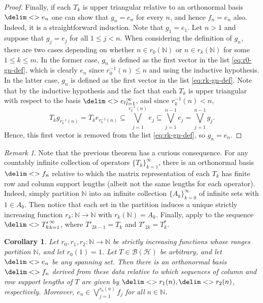 \documentclass[10pt,reqno]{amsart}
\newtheorem{corollary}[theorem]{Corollary}
\theoremstyle{remark}
\newtheorem{remark}[theorem]{Remark}
\newcommand{\BH}{\mathcal{B}(\Hil)}
\newcommand{\Hil}{\mathcal{H}}
\newcommand{\seq}{\delim<>}
\numberwithin{equation}{section}
\begin{document}
\begin{proof}
  Finally, if each $T_k$ is upper triangular relative to an orthonormal basis $\seq{e_n}$ one can show that $g_n = e_n$ for every $n$, and hence $f_n = e_n$ also.
  Indeed, it is a straightforward induction.
  Note that $g_1 = e_1$.
  Let $n > 1$ and suppose that $g_j = e_j$ for all $1 \le j < n$.
  When considering the definition of $g_n$, there are two cases depending on whether $n \in r_0(\mathbb{N})$ or $n \in r_k(\mathbb{N})$ for some $1 \le k \le m$.
  In the former case, $g_n$ is defined as the first vector in the list \eqref{eq:r0-gn-def}, which is clearly $e_n$ since $r_0^{-1}(n) \le n$ and using the inductive hypothesis.
  In the latter case, $g_n$ is defined as the first vector in the list \eqref{eq:rk-gn-def}.
  Note that by the inductive hypothesis and the fact that each $T_k$ is upper triangular with respect to the basis $\seq{e_l}_{l=1}^{\infty}$, and since $r_k^{-1}(n) < n$, 
  \begin{equation*}
    T_k g_{r_k^{-1}(n)} = T_k e_{r_k^{-1}(n)} \subseteq \bigvee_{j=1}^{r_k^{-1}(n)} e_j \subseteq \bigvee_{j=1}^{n-1} e_j = \bigvee_{j=1}^{n-1} g_j.
  \end{equation*}
  Hence, this first vector is removed from the list \eqref{eq:rk-gn-def}, so $g_n = e_n$.
\end{proof}

\begin{remark}
  \label{rem:countable-simultaneous-finite-support-lengths}
  Note that the previous theorem has a curious consequence.
  For any countably infinite collection of operators $\{T_k\}_{k=1}^{\infty}$, there is an orthonormal basis $\seq{f_n}$ relative to which the matrix representation of each $T_k$ has finite row and column support lengths (albeit not the same lengths for each operator).
  Indeed, simply partition $\mathbb{N}$ into an infinite collection $\{A_k\}_{k=0}^{\infty}$ of infinite sets with $1 \in A_0$.
  Then notice that each set in the partition induces a unique strictly increasing function $r_k : \mathbb{N} \to \mathbb{N}$ with $r_k(\mathbb{N}) = A_k$.
  Finally, apply  to the sequence $\seq{T'_k}_{k=1}^{\infty}$, where $T'_{2k-1} = T_k$ and $T'_{2k} = T_k^{*}$.
\end{remark}

\begin{corollary}
  \label{cor:single-operator-arbitrary-staircase}
  Let $r_0,r_1,r_2 : \mathbb{N} \to \mathbb{N}$ be strictly increasing functions whose ranges partition $\mathbb{N}$, and let $r_0(1) = 1$.
  Let $T \in \BH$ be arbitrary, and let $\seq{e_n}$ be any spanning set.
  Then there is an orthonormal basis $\seq{f_n}$ derived from these data relative to which sequences of column and row support lengths of $T$ are given by $\seq{r_1(n)}, \seq{r_2(n)}$, respectively.
  Moreover, $e_n \in \bigvee_{j=1}^{r_0(n)} f_j$ for all $n \in \mathbb{N}$.
\end{corollary}
\end{document}
